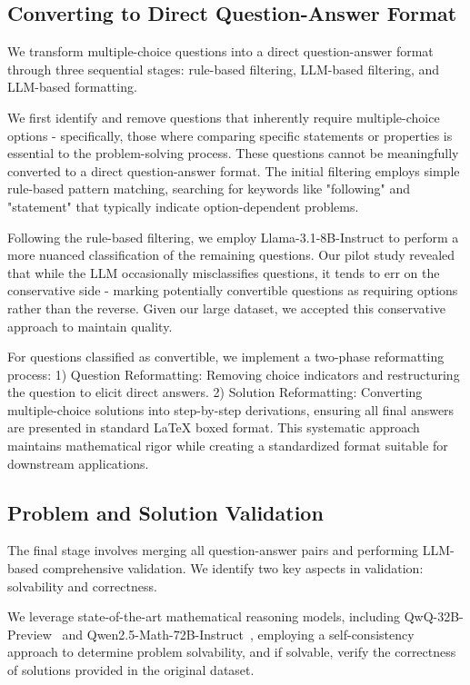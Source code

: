 \subsection{Converting to Direct Question-Answer Format}


We transform multiple-choice questions into a direct question-answer format through three sequential stages: rule-based filtering, LLM-based filtering, and LLM-based formatting.

We first identify and remove questions that inherently require multiple-choice options - specifically, those where comparing specific statements or properties is essential to the problem-solving process. These questions cannot be meaningfully converted to a direct question-answer format. The initial filtering employs simple rule-based pattern matching, searching for keywords like "following" and "statement" that typically indicate option-dependent problems.

Following the rule-based filtering, we employ Llama-3.1-8B-Instruct to perform a more nuanced classification of the remaining questions. Our pilot study revealed that while the LLM occasionally misclassifies questions, it tends to err on the conservative side - marking potentially convertible questions as requiring options rather than the reverse. Given our large dataset, we accepted this conservative approach to maintain quality.

For questions classified as convertible, we implement a two-phase reformatting process: 1) Question Reformatting: Removing choice indicators and restructuring the question to elicit direct answers. 2) Solution Reformatting: Converting multiple-choice solutions into step-by-step derivations, ensuring all final answers are presented in standard LaTeX boxed format. This systematic approach maintains mathematical rigor while creating a standardized format suitable for downstream applications.

\subsection{Problem and Solution Validation}

The final stage involves merging all question-answer pairs and performing LLM-based comprehensive validation. We identify two key aspects in validation: solvability and correctness.

We leverage state-of-the-art mathematical reasoning models, including QwQ-32B-Preview~\citep{qwq-32b-preview} and Qwen2.5-Math-72B-Instruct~\citep{yang2024qwen25mathtechnicalreportmathematical}, employing a self-consistency approach to determine problem solvability, and if solvable, verify the correctness of solutions provided in the original dataset.


